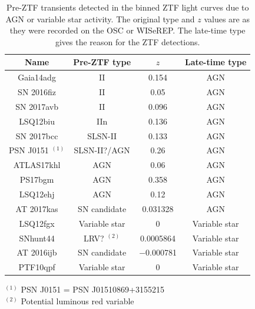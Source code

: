 \documentclass[a4paper,oneside,12pt, class=Latex/Classes/PhDthesisPSnPDF, crop=false]{standalone}
\begin{document}
\begin{table}
    \centering
    \caption{Pre-ZTF transients detected in the binned ZTF light curves due to AGN or variable star activity. The original type and $z$ values are as they were recorded on the OSC or WISeREP. The late-time type gives the reason for the ZTF detections.}
    \begin{tabular}{cccc}
        \hline
        \hline
        Name & Pre-ZTF type & $z$ & Late-time type\\
        \hline
        Gaia14adg & II & 0.154 & AGN\\
        SN 2016fiz & II & 0.05 & AGN\\
        SN 2017avb & II & 0.096 & AGN\\
        LSQ12biu & IIn & 0.136 & AGN\\
        SN 2017bcc & SLSN-II & 0.133 & AGN\\
        PSN J0151 $^{(1)}$ & SLSN-II?/AGN & 0.26 & AGN\\
        ATLAS17khl & AGN & 0.06 & AGN\\
        PS17bgm & AGN & 0.358 & AGN\\
        LSQ12ehj & AGN & 0.12 & AGN\\
        AT 2017kas & SN candidate & 0.031328 & AGN\\
        LSQ12fgx & Variable star & 0 & Variable star\\
        SNhunt44 & LRV? $^{(2)}$ & 0.0005864 & Variable star\\
        AT 2016ijb & SN candidate & $-$0.000781 & Variable star\\
        PTF10qpf & Variable star & 0 & Variable star\\
        \hline
    \end{tabular}
    \label{non-transient_table}
    \begin{flushleft}
        $^{(1)}$ PSN J0151 = PSN J01510869+3155215\\
        $^{(2)}$ Potential luminous red variable
    \end{flushleft}
\end{table}
\end{document}

